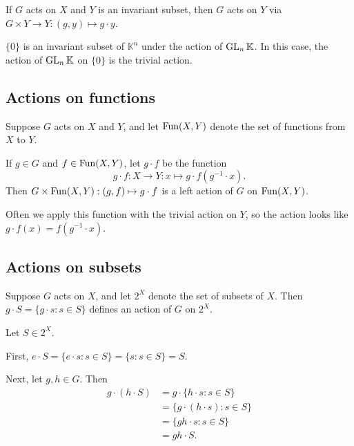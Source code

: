 \documentclass[12pt,letterpaper]{report}
\begin{document}
\begin{lem}{}{}
  If $G$ acts on $X$ and $Y$ is an invariant subset, then $G$ acts on $Y$ via
  $G \times Y \to Y : (g, y) \mapsto g \cdot y$.
\end{lem}

\begin{ex}
  $\{0\}$ is an invariant subset of $\mathbb{K}^n$ under the action of $\operatorname{GL}_n\mathbb{K}$.
  In this case, the action of $\operatorname{GL}_n\mathbb{K}$ on $\{0\}$ is the trivial action.
\end{ex}

\pagebreak
\subsection{Actions on functions}

\begin{prop}{}{}
  Suppose $G$ acts on $X$ and $Y$, and let $\operatorname{Fun}(X, Y)$ denote the set of functions from $X$ to $Y$.

  If $g \in G$ and $f \in \operatorname{Fun}(X, Y)$, let $g \cdot f$ be the function
  \[ g \cdot f \colon X \to Y : x \mapsto g \cdot f(g^{-1} \cdot x). \]
  Then $G \times \operatorname{Fun}(X, Y) : (g, f) \mapsto g \cdot f$ is a left action of $G$ on $\operatorname{Fun}(X, Y)$.
\end{prop}

\begin{thmproof}
\end{thmproof}

Often we apply this function with the trivial action on $Y$, so the action looks like
$g \cdot f(x) = f(g^{-1} \cdot x)$.

\pagebreak
\subsection{Actions on subsets}

\begin{prop}{}{}
  Suppose $G$ acts on $X$, and let $2^X$ denote the set of subsets of $X$.
  Then $g \cdot S = \{g \cdot s : s \in S\}$ defines an action of $G$ on $2^X$.
\end{prop}

\begin{thmproof}
  Let $S \in 2^X$.

  First, $e \cdot S = \{e \cdot s : s \in S\} = \{s : s \in S\} = S$.

  Next, let $g, h \in G$.
  Then
  \begin{align*}
    g \cdot (h \cdot S)
    &= g \cdot \{h \cdot s : s \in S\} \\
    &= \{g \cdot (h \cdot s) : s \in S\} \\
    &= \{gh \cdot s : s \in S\} \\
    &= gh \cdot S.
  \end{align*}
\end{thmproof}
\end{document}
